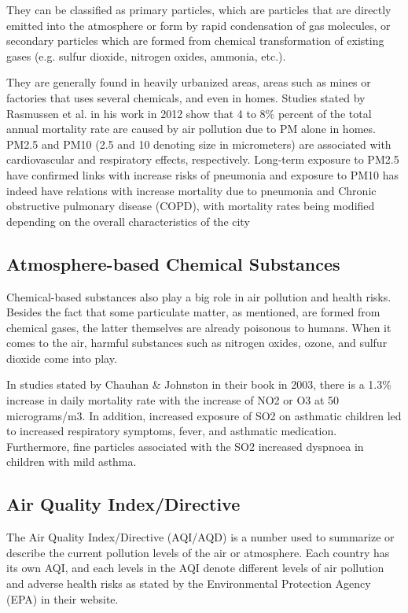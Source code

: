 \documentclass[10pt,11pt,12pt,oneside]{book}
\begin{document}
        They can be classified as primary particles, which are particles that are directly emitted into the atmosphere or form by rapid condensation of gas molecules, or secondary particles which are formed from chemical transformation of existing gases (e.g. sulfur dioxide, nitrogen oxides, ammonia, etc.). \cite{finlayson2000chemistry}
        
        They are generally found in heavily urbanized areas, areas such as mines or factories that uses several chemicals, and even in homes. Studies stated by Rasmussen et al. in his work in 2012 show that 4 to 8\% percent of the total annual mortality rate are caused by air pollution due to PM alone in homes. PM2.5 and PM10 (2.5 and 10 denoting size in micrometers) are associated with cardiovascular and respiratory effects, respectively. Long-term exposure to PM2.5 have confirmed links with increase risks of pneumonia \cite{Neupane2010} and exposure to PM10 has indeed have relations with increase mortality due to pneumonia and Chronic obstructive pulmonary disease (COPD), with mortality rates being modified depending on the overall characteristics of the city \cite{MedinaRamn2006}
        \subsection{Atmosphere-based Chemical Substances}
        Chemical-based substances also play a big role in air pollution and health risks. Besides the fact that some particulate matter, as mentioned, are formed from chemical gases, the latter themselves are already poisonous to humans. When it comes to the air, harmful substances such as nitrogen oxides, ozone, and sulfur dioxide come into play. 
        
        In studies stated by Chauhan \& Johnston in their book in 2003, there is a 1.3\% increase in daily mortality rate with the increase of NO2 or O3 at 50 micrograms/m3. In addition, increased exposure of SO2 on asthmatic children led to increased respiratory symptoms, fever, and asthmatic medication. Furthermore, fine particles associated with the SO2 increased dyspnoea in children with mild asthma. \cite{doi:10.1093/bmb/ldg022}
        \subsection{Air Quality Index/Directive}
        The Air Quality Index/Directive (AQI/AQD) is a number used to summarize or describe the current pollution levels of the air or atmosphere. Each country has its own AQI, and each levels in the AQI denote different levels of air pollution and adverse health risks as stated by the Environmental Protection Agency (EPA) in their website. \cite{airbasics}
\end{document}
